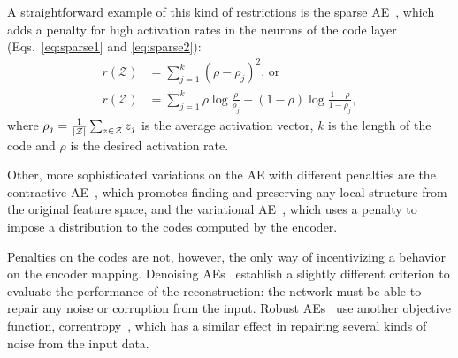 A straightforward example of this kind of restrictions is the sparse AE~, which adds a penalty for high activation rates in the neurons of the code layer (Eqs.~\ref{eq:sparse1} and \ref{eq:sparse2}):
\begin{align}
    \label{eq:sparse1}
    r(\mathcal Z)&=\sum_{j=1}^k(\rho-\rho_j)^2\mbox{, or}\\
    \label{eq:sparse2}
    r(\mathcal Z)&=\sum_{j=1}^k \rho \log\frac{\rho}{\rho_j}+(1-\rho)\log\frac{1-\rho}{1-\rho_j},
\end{align}
where $\rho_j=\frac{1}{\lvert\mathcal Z\rvert}\sum_{z\in \mathcal Z}z_{j}$ is the average activation vector, $k$ is the length of the code and $\rho$ is the desired activation rate.

Other, more sophisticated variations on the AE with different penalties are the contractive AE~, which promotes finding and preserving any local structure from the original feature space, and the variational AE~, which uses a penalty to impose a distribution to the codes computed by the encoder.

Penalties on the codes are not, however, the only way of incentivizing a behavior on the encoder mapping. Denoising AEs~ establish a slightly different criterion to evaluate the performance of the reconstruction: the network must be able to repair any noise or corruption from the input.  Robust AEs~ use another objective function, correntropy~, which has a similar effect in repairing several kinds of noise from the input data.


